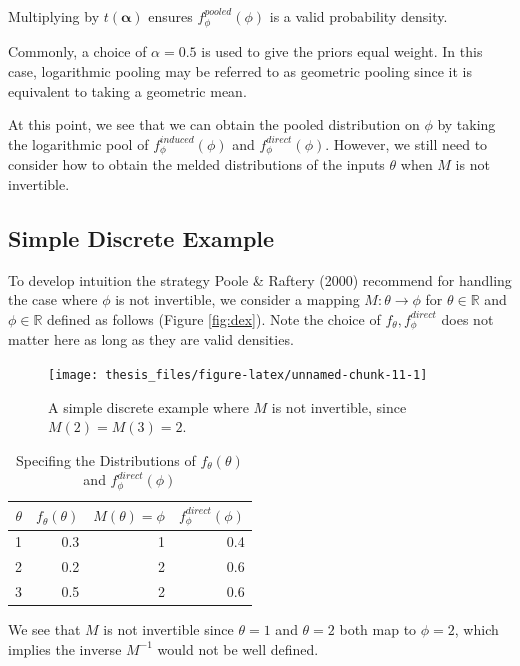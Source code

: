 \documentclass[12pt,twoside]{smiththesis}
\begin{document}
\noindent Multiplying by \(t(\boldsymbol \alpha)\) ensures \(f_\phi^{pooled} (\phi)\) is a valid probability density.

Commonly, a choice of \(\alpha = 0.5\) is used to give the priors equal weight. In this case, logarithmic pooling may be referred to as geometric pooling since it is equivalent to taking a geometric mean.

At this point, we see that we can obtain the pooled distribution on \(\phi\) by taking the logarithmic pool of \(f^{induced}_\phi(\phi)\) and \(f^{direct}_\phi(\phi)\). However, we still need to consider how to obtain the melded distributions of the inputs \(\theta\) when \(M\) is not invertible.

\hypertarget{simple-discrete-example}{%
\subsection{Simple Discrete Example}\label{simple-discrete-example}}

To develop intuition the strategy Poole \& Raftery (2000) recommend for handling the case where \(\phi\) is not invertible, we consider a mapping \(M: \theta \to \phi\) for \(\theta \in \mathbb{R}\) and \(\phi \in \mathbb{R}\)
defined as follows (Figure \ref{fig:dex}). Note the choice of \(f_\theta,f_\phi^{direct}\) does not matter here as long as they are valid densities.
\begin{figure}

{\centering \texttt{[image: thesis\_files/figure-latex/unnamed-chunk-11-1]} 

}

\caption{\label{fig:dex}A simple discrete example where $M$ is not invertible, since $M(2)=M(3)=2$.}\label{fig:unnamed-chunk-11}
\end{figure}
\begin{table}[H]

\caption{\label{tab:unnamed-chunk-12}\label{table:example-dist}Specifing the Distributions of $f_\theta(\theta)$ and $f_\phi^{direct}(\phi)$}
\centering
\begin{tabular}[t]{r|r|r|r}
\hline
$\theta$ & $f_\theta(\theta)$ & $M(\theta)=\phi$ & $f_\phi^{direct}(\phi)$\\
\hline
1 & 0.3 & 1 & 0.4\\
\hline
2 & 0.2 & 2 & 0.6\\
\hline
3 & 0.5 & 2 & 0.6\\
\hline
\end{tabular}
\end{table}
We see that \(M\) is not invertible since \(\theta=1\) and \(\theta = 2\) both map to \(\phi=2\), which implies the inverse \(M^{-1}\) would not be well defined.
\end{document}
